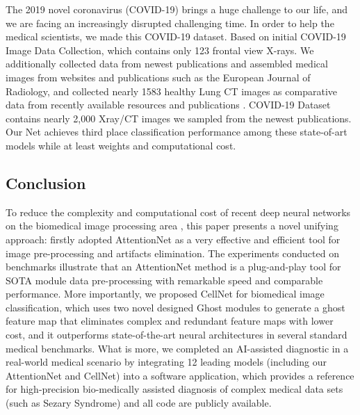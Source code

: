 The 2019 novel coronavirus (COVID-19) brings a huge challenge to our life, and we are facing an increasingly disrupted challenging time. In order to help the medical scientists, we made this COVID-19 dataset. Based on initial COVID-19 Image Data Collection\cite{37}, which contains only 123 frontal view X-rays. We additionally collected data from newest publications and assembled medical images from websites and publications such as the European Journal of Radiology\cite{36}, and collected nearly 1583 healthy Lung CT images as comparative data from recently available resources and publications\cite{37} \cite{38}. COVID-19 Dataset contains nearly 2,000 Xray/CT images we sampled from the newest publications. Our Net achieves third place classification performance among these state-of-art models while at least weights and computational cost.




\subsection*{Conclusion}
To reduce the complexity and computational cost of recent deep neural networks on the biomedical image processing area \cite{3}\cite{15}\cite{17}, this paper presents a novel unifying approach: firstly adopted AttentionNet as a very effective and efficient tool for image pre-processing and artifacts elimination. The experiments conducted on benchmarks illustrate that an AttentionNet method is a plug-and-play tool for SOTA module data pre-processing with remarkable speed and comparable performance. More importantly, we proposed CellNet for biomedical image classification, which uses two novel designed Ghost modules to generate a ghost feature map that eliminates complex and redundant feature maps with lower cost, and it outperforms state-of-the-art neural architectures in several standard medical benchmarks.
What is more, we completed an AI-assisted diagnostic in a real-world medical scenario by integrating 12 leading models (including our AttentionNet and CellNet) into a software application, which provides a reference for high-precision bio-medically assisted diagnosis of complex medical data sets (such as Sezary Syndrome) and all code are publicly available.




